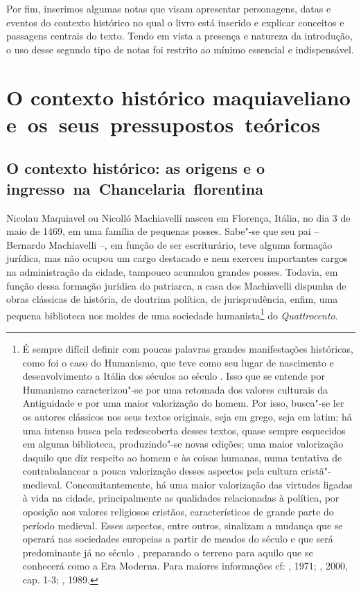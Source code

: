 Por fim, inserimos algumas notas que visam apresentar personagens, datas
e eventos do contexto histórico no qual o livro está inserido e explicar
conceitos e passagens centrais do texto. Tendo em vista a presença e
natureza da introdução, o uso desse segundo tipo de notas foi restrito
ao mínimo essencial e indispensável.

\section{O contexto histórico maquiaveliano e~os~seus~pressupostos~teóricos}

\subsection{O contexto histórico: as origens e o ingresso~na~Chancelaria~florentina}

Nicolau Maquiavel ou Nicolló Machiavelli nasceu em Florença, Itália, no
dia 3 de maio de 1469, em uma família de pequenas posses. Sabe"-se que
seu pai -- Bernardo Machiavelli --, em função de ser escriturário, teve
alguma formação jurídica, mas não ocupou um cargo destacado e nem
exerceu importantes cargos na administração da cidade, tampouco acumulou
grandes posses. Todavia, em função dessa formação jurídica do patriarca,
a casa dos Machiavelli dispunha de obras clássicas de história, de
doutrina política, de jurisprudência, enfim, uma pequena biblioteca nos
moldes de uma sociedade humanista\footnote{É sempre difícil definir com
  poucas palavras grandes manifestações históricas, como foi o caso do
  Humanismo, que teve como seu lugar de nascimento e desenvolvimento a
  Itália dos séculos  ao século . Isso que se entende por
  Humanismo caracterizou"-se por uma retomada dos valores culturais da
  Antiguidade e por uma maior valorização do homem. Por isso, busca"-se
  ler os autores clássicos nos seus textos originais, seja em grego,
  seja em latim; há uma intensa busca pela redescoberta desses textos,
  quase sempre esquecidos em alguma biblioteca, produzindo"-se novas
  edições; uma maior valorização daquilo que diz respeito ao homem e às
  coisas humanas, numa tentativa de contrabalancear a pouca valorização
  desses aspectos pela cultura cristã"-medieval. Concomitantemente, há
  uma maior valorização das virtudes ligadas à vida na cidade,
  principalmente as qualidades relacionadas à política, por oposição aos
  valores religiosos cristãos, característicos de grande parte do
  período medieval. Esses aspectos, entre outros, sinalizam a mudança
  que se operará nas sociedades europeias a partir de meados do século
   e que será predominante já no século , preparando o terreno
  para aquilo que se conhecerá como a Era Moderna. Para maiores
  informações cf: , 1971; , 2000, cap. 1-3; , 1989.} do
\emph{Quattrocento}.

